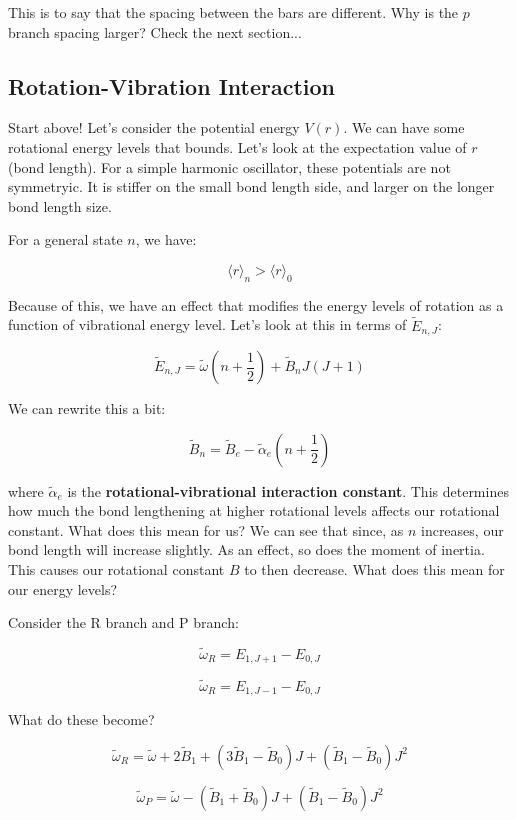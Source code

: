 \documentclass{article}
\newcommand{\be}{\begin{equation}}
\newcommand{\ee}{\end{equation}}
\begin{document}
This is to say that the spacing between the bars are different. Why is the $p$ branch spacing larger? Check the next section...

\subsection{Rotation-Vibration Interaction}
 
Start above! Let's consider the potential energy $V(r)$. We can have some rotational energy levels that bounds. Let's look at the expectation value of $r$ (bond length). For a simple harmonic oscillator, these potentials are not symmetryic. It is stiffer on the small bond length side, and larger on the longer bond length size.

For a general state $n$, we have:

\be
\langle r \rangle_n > \langle r \rangle_0 
\ee

Because of this, we have an effect that modifies the energy levels of rotation as a function of vibrational energy level. Let's look at this in terms of $\tilde E_{n,J}$:

\be
\tilde E _{n,J} = \tilde \omega \left(n+\frac12\right) + \tilde B_n J \left(J+1\right)
\ee

We can rewrite this a bit:

\be
\tilde B_n = \tilde B_e - \tilde \alpha_e \left(n +\frac12\right)
\ee

where $\tilde \alpha_e$ is the \textbf{rotational-vibrational interaction constant}. This determines how much the bond lengthening at higher rotational levels affects our rotational constant. What does this mean for us? We can see that since, as $n$ increases, our bond length will increase slightly. As an effect, so does the moment of inertia. This causes our rotational constant $B$ to then decrease. What does this mean for our energy levels?

Consider the R branch and P branch:

\be
\tilde \omega_R = E_{1,J+1} - E_{0,J}
\ee

\be
\tilde \omega_R = E_{1,J-1} - E_{0,J}
\ee

What do these become?

\be
\tilde \omega_R = \tilde \omega + 2 \tilde B_1 + \left(3 \tilde B_1 - \tilde B_0\right)J + \left(\tilde B_1 - \tilde B_0\right)J^2
\ee

\be
\tilde \omega_P = \tilde \omega - \left(\tilde B_1 + \tilde B_0\right)J + \left(\tilde B_1 - \tilde B_0\right)J^2
\ee
\end{document}

